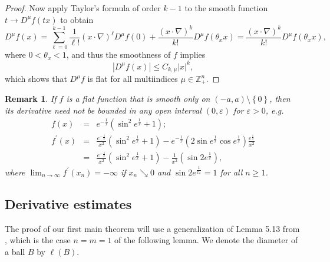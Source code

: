 \documentclass{amsart}
\theoremstyle{plain}
\newtheorem{remark}[theorem]{Remark}
\numberwithin{equation}{section}
\begin{document}
\begin{proof}
Now apply Taylor's formula of order $k-1$ to the smooth function $%
t\rightarrow D^{\mu }f\left( tx\right) $ to obtain%
\begin{equation*}
D^{\mu }f\left( x\right) =\sum_{\ell =0}^{k-1}\frac{1}{\ell !}\left( x\cdot
\nabla \right) ^{\ell }D^{\mu }f\left( 0\right) +\frac{\left( x\cdot \nabla
\right) ^{k}}{k!}D^{\mu }f\left( \theta _{x}x\right) =\frac{\left( x\cdot
\nabla \right) ^{k}}{k!}D^{\mu }f\left( \theta _{x}x\right) ,
\end{equation*}%
where $0<\theta _{x}<1$, and thus the smoothness of $f$ implies%
\begin{equation*}
\left\vert D^{\mu }f\left( x\right) \right\vert \leq C_{k,\mu }\left\vert
x\right\vert ^{k},
\end{equation*}%
which shows that $D^{\mu }f$ is flat for all multiindices $\mu \in \mathbb{Z}%
_{+}^{n}$.
\end{proof}

\begin{remark}
\label{smooth away}If $f$ is a flat function that is smooth only on $\left(
-a,a\right) \setminus \left\{ 0\right\} $, then its derivative need not be
bounded in any open interval $\left( 0,\varepsilon \right) $ for $%
\varepsilon >0$, e.g. 
\begin{eqnarray*}
f\left( x\right) &=&e^{-\frac{1}{x}}\left( \sin ^{2}e^{\frac{1}{x}}+1\right)
; \\
f^{\prime }\left( x\right) &=&\frac{e^{-\frac{1}{x}}}{x^{2}}\left( \sin
^{2}e^{\frac{1}{x}}+1\right) -e^{-\frac{1}{x}}\left( 2\sin e^{\frac{1}{x}%
}\cos e^{\frac{1}{x}}\right) \frac{e^{\frac{1}{x}}}{x^{2}} \\
&=&\frac{e^{-\frac{1}{x}}}{x^{2}}\left( \sin ^{2}e^{\frac{1}{x}}+1\right) -%
\frac{1}{x^{2}}\left( \sin 2e^{\frac{1}{x}}\right) ,
\end{eqnarray*}%
where $\lim_{n\rightarrow \infty }f^{\prime }\left( x_{n}\right) =-\infty $
if $x_{n}\searrow 0$ and $\sin 2e^{\frac{1}{x_{n}}}=1$ for all $n\geq 1$.
\end{remark}

\subsection{Derivative estimates}

The proof of our first main theorem will use a generalization of Lemma 5.13
from \cite{GuSa}, which is the case $n=m=1$ of the following lemma. We
denote the diameter of a ball $B$ by $\ell \left( B\right) $.
\end{document}
